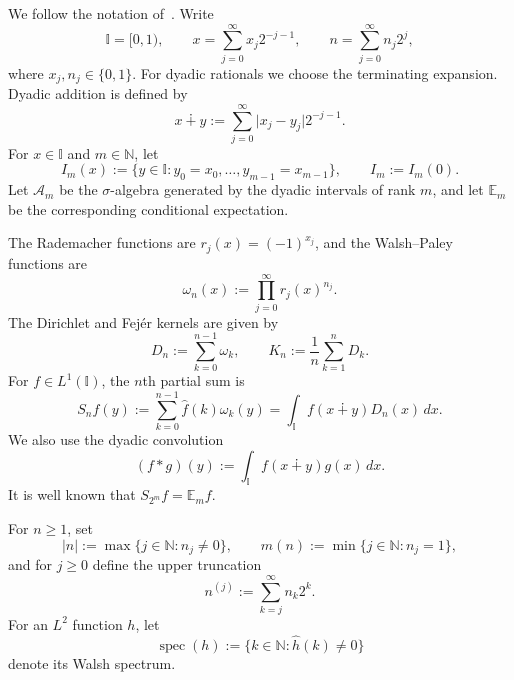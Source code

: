 \documentclass[11pt]{amsart}
\numberwithin{equation}{section}
\DeclareMathOperator{\spec}{spec}
\theoremstyle{remark}
\begin{document}
We follow the notation of~\cite{Gat2019,SchippBook}. Write 
\begin{equation*}
\mathbb{I}=[0,1),\qquad x=\sum_{j=0}^{\infty}x_j2^{-j-1},\qquad
n=\sum_{j=0}^{\infty}n_j2^j, 
\end{equation*}
where $x_j,n_j\in\{0,1\}$. For dyadic rationals we choose the terminating
expansion. Dyadic addition is defined by 
\begin{equation*}
x\dotplus y:=\sum_{j=0}^{\infty}\lvert x_j-y_j\rvert2^{-j-1}. 
\end{equation*}
For $x\in\mathbb{I}$ and $m\in\mathbb{N}$, let 
\begin{equation*}
I_m(x):=\{y\in\mathbb{I}:y_0=x_0,\dots,y_{m-1}=x_{m-1}\},\qquad I_m:=I_m(0). 
\end{equation*}
Let $\mathcal{A}_m$ be the $\sigma$-algebra generated by the dyadic
intervals of rank $m$, and let $\mathbb{E}_m$ be the corresponding
conditional expectation.

The Rademacher functions are $r_j(x)=(-1)^{x_j}$, and the Walsh--Paley
functions are 
\begin{equation*}
\omega_n(x):=\prod_{j=0}^{\infty} r_j(x)^{n_j}. 
\end{equation*}
The Dirichlet and Fej\'er kernels are given by 
\begin{equation*}
D_n:=\sum_{k=0}^{n-1}\omega_k, \qquad K_n:=\frac1n\sum_{k=1}^n D_k. 
\end{equation*}
For $f\in L^1(\mathbb{I})$, the $n$th partial sum is 
\begin{equation*}
S_n f(y):=\sum_{k=0}^{n-1}\widehat f(k)\omega_k(y)  =\int_{\mathbb{I}}
f(x\dotplus y)D_n(x)\,dx. 
\end{equation*}
We also use the dyadic convolution 
\begin{equation*}
(f*g)(y):=\int_{\mathbb{I}}f(x\dotplus y)g(x)\,dx. 
\end{equation*}
It is well known that $S_{2^m}f=\mathbb{E}_m f$.

For $n\ge1$, set 
\begin{equation*}
|n|:=\max\{j\in\mathbb{N}:n_j\ne0\}, \qquad m(n):=\min\{j\in\mathbb{N}%
:n_j=1\}, 
\end{equation*}
and for $j\ge0$ define the upper truncation 
\begin{equation*}
n^{(j)}:=\sum_{k=j}^{\infty} n_k2^k. 
\end{equation*}
For an $L^2$ function $h$, let 
\begin{equation*}
\spec(h):=\{k\in\mathbb{N}:\widehat h(k)\ne0\} 
\end{equation*}
denote its Walsh spectrum.
\end{document}
